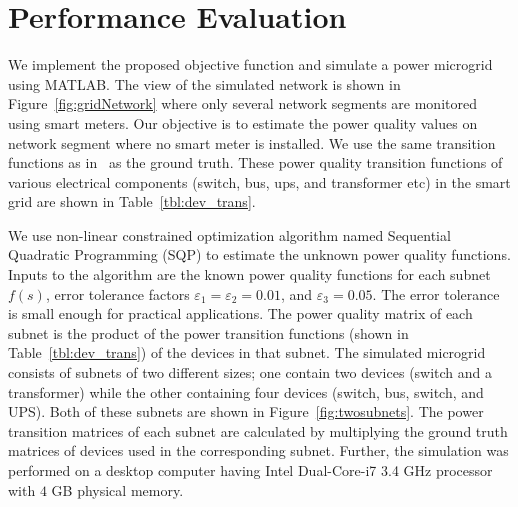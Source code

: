 \begin{table}[!t]
\end{table}

\section{Performance Evaluation}
\label{sec:evaluation}
We implement the proposed objective function and simulate a power microgrid using MATLAB. The view of the simulated network is shown in Figure~\ref{fig:gridNetwork} where only several network segments are monitored using smart meters. Our objective is to estimate the power quality values on network segment where no smart meter is installed. We use the same transition functions as in~\cite{catherine_pri} as the ground truth. These power quality transition functions of various electrical components (switch, bus, ups, and transformer etc) in the smart grid are shown in Table~\ref{tbl:dev_trans}.

We use non-linear constrained optimization algorithm named Sequential Quadratic Programming (SQP) to estimate the unknown power quality functions. Inputs to the algorithm are the known power quality functions for each subnet $f(s)$, error tolerance factors $\varepsilon_1 = \varepsilon_2 = 0.01$, and $ \varepsilon_3 = 0.05$. The error tolerance is small enough for practical applications. The power quality matrix of each subnet is the product of the power transition functions (shown in Table~\ref{tbl:dev_trans}) of the devices in that subnet. The simulated microgrid consists of subnets of two different sizes; one contain two devices (switch and a transformer) while the other containing four devices (switch, bus, switch, and UPS). Both of these subnets are shown in Figure~\ref{fig:twosubnets}. The power transition matrices of each subnet are calculated by multiplying the ground truth matrices of devices used in the corresponding subnet. Further, the simulation was performed on a desktop computer having Intel Dual-Core-i7 3.4 GHz processor with $4$ GB physical memory.

